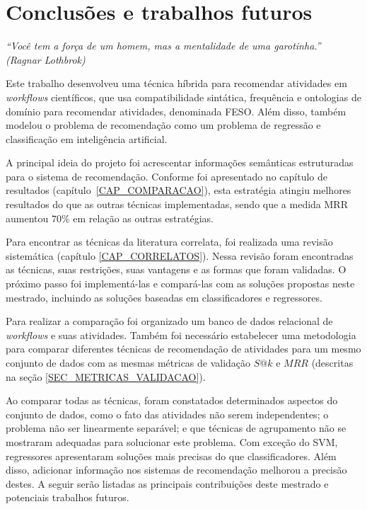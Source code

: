 \chapter{Conclusões e trabalhos futuros}\label{CAP_CONCLUSOES}
\begin{flushright}
	\textit{``Você tem a força de um homem, mas a mentalidade de uma garotinha.''\\ (Ragnar Lothbrok)}
\end{flushright}

Este trabalho desenvolveu uma técnica híbrida para recomendar atividades em \emph{workflows} científicos, que usa compatibilidade sintática, frequência e ontologias de domínio para recomendar atividades, denominada FESO. Além disso, também modelou o problema de recomendação como um problema de regressão e classificação em inteligência artificial.

A principal ideia do projeto foi acrescentar informações semânticas estruturadas para o sistema de recomendação. Conforme foi apresentado no capítulo de resultados (capítulo~\ref{CAP_COMPARACAO}), esta estratégia atingiu melhores resultados do que as outras técnicas implementadas, sendo que a medida MRR aumentou \(70\%\) em relação as outras estratégias.

Para encontrar as técnicas da literatura correlata, foi realizada uma revisão sistemática (capítulo \ref{CAP_CORRELATOS}). Nessa revisão foram encontradas as técnicas, suas restrições, suas vantagens e as formas que foram validadas. O próximo passo foi implementá-las e compará-las com as soluções propostas neste mestrado, incluindo as soluções baseadas em classificadores e regressores. 

Para realizar a comparação foi organizado um banco de dados relacional de \emph{workflows} e suas atividades. Também foi necessário estabelecer uma metodologia para comparar diferentes técnicas de recomendação de atividades para um mesmo conjunto de dados com as mesmas métricas de validação \(S@k\) e \(MRR\) (descritas na seção \ref{SEC_METRICAS_VALIDACAO}). 

Ao comparar todas as técnicas, foram constatados determinados aspectos do conjunto de dados, como o fato das atividades não serem independentes; o problema não ser linearmente separável; e que técnicas de agrupamento não se mostraram adequadas para solucionar este problema. Com exceção do SVM, regressores apresentaram soluções mais precisas do que classificadores. Além disso, adicionar informação nos sistemas de recomendação melhorou a precisão destes. A seguir serão listadas as principais contribuições deste mestrado e potenciais trabalhos futuros.

